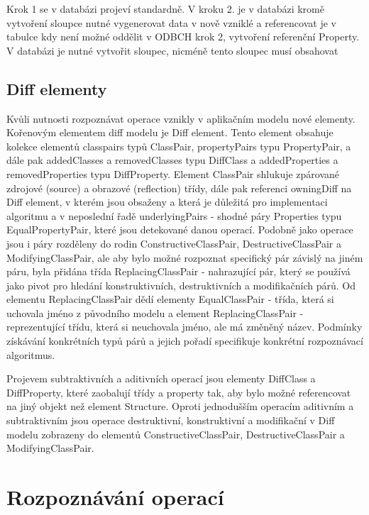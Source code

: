 \documentclass[11pt,twoside,a4paper]{book}
\begin{document}
Krok 1 se v databázi projeví standardně. V kroku 2. je v databázi kromě
vytvoření sloupce nutné vygenerovat data v nově vzniklé a referencovat je
v tabulce kdy není možné oddělit v ODBCH krok 2, vytvoření referenční Property.
V databázi je nutné vytvořit sloupec, nicméně tento sloupec musí obsahovat 

\subsection{Diff elementy}

 Kvůli nutnosti rozpoznávat operace vznikly v aplikačním modelu nové
 elementy. Kořenovým elementem diff modelu je Diff element. Tento element
 obsahuje kolekce elementů classpairs typů ClassPair, propertyPairs
 typu PropertyPair, a dále pak addedClasses a removedClasses typu DiffClass a
 addedProperties a removedProperties typu DiffProperty. Element ClassPair
 shlukuje zpárované zdrojové (source) a obrazové (reflection) třídy, dále pak
 referenci owningDiff na Diff element, v kterém jsou obsaženy a která je
 důležitá pro implementaci algoritmu a v neposlední řadě underlyingPairs -
 shodné páry Properties typu EqualPropertyPair, které jsou detekované danou
 operací. Podobně jako operace jsou i páry rozděleny do rodin ConstructiveClassPair,
 DestructiveClassPair a ModifyingClassPair, ale aby bylo možné rozpoznat specifický 
 pár závislý na jiném páru, byla přidána třída ReplacingClassPair - nahrazující pár,
 který se používá jako pivot pro hledání konstruktivních, destruktivních a 
 modifikačních párů. Od elementu ReplacingClassPair dědí elementy EqualClassPair 
 - třída, která si uchovala jméno z původního modelu a element ReplacingClassPair - 
 reprezentující třídu, která si neuchovala jméno, ale má změněný název. Podmínky 
 získávání konkrétních typů párů a jejich pořadí specifikuje konkrétní rozpoznávací 
 algoritmus.
 
 Projevem subtraktivních a aditivních operací jsou elementy DiffClass a
 DiffProperty, které zaobalují třídy a property tak, aby bylo možné referencovat
 na jiný objekt než element Structure. Oproti jednodušším operacím aditivním a
 subtraktivním jsou operace destruktivní, konstruktivní a modifikační v Diff
 modelu zobrazeny do elementů ConstructiveClassPair, DestructiveClassPair a
 ModifyingClassPair. 

\section{Rozpoznávání operací}
\end{document}
